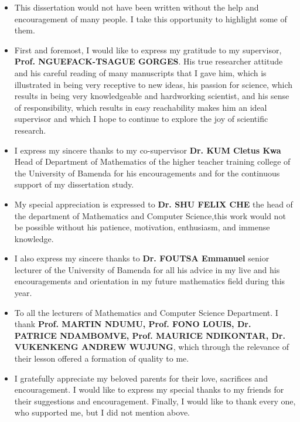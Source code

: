 \documentclass[a4paper,12pt,openany]{report}
\theoremstyle{plain}
\theoremstyle{plain}
\theoremstyle{plain}
\theoremstyle{plain}
\theoremstyle{plain}
\theoremstyle{plain}
\theoremstyle{plain}
\theoremstyle{plain}
\theoremstyle{plain}
\theoremstyle{plain}
\theoremstyle{plain}
\theoremstyle{plain}
\begin{document}
\begin{itemize}
\item[]	This dissertation would not have been written without the help and encouragement of many people. I
	take this opportunity to highlight some of them.
	
	\item[] First and foremost, I would like to express my gratitude to my supervisor, \textbf{Prof. NGUEFACK-TSAGUE GORGES}.
		His true researcher attitude and his careful reading of many manuscripts that I gave him, which is illustrated in being very receptive to new ideas, his passion
		for science, which results in being very knowledgeable and hardworking scientist, and his sense of
		responsibility, which results in easy reachability makes him an ideal supervisor and which I hope to continue to explore the joy of scientific research.
		\item[] I express my sincere thanks to my co-supervisor \textbf{Dr. KUM Cletus Kwa} Head of Department of Mathematics of the higher teacher training college of the University of Bamenda for his encouragements and for the continuous support of my dissertation study. 
		
		  \item[] My special appreciation
		is expressed to \textbf{ Dr. SHU FELIX CHE} the head of the department of Mathematics and Computer
		Science,this work would not be possible
		without his patience, motivation, enthusiasm, and immense knowledge.  
		
		\item[] I also express my sincere thanks to \textbf{Dr. FOUTSA Emmanuel} senior lecturer of the University of Bamenda for all his advice in my live and his encouragements and orientation in my future mathematics field during this year. 
		\item[] To all the lecturers of Mathematics and Computer Science Department. I thank \textbf{Prof. MARTIN NDUMU, Prof. FONO LOUIS, Dr. PATRICE NDAMBOMVE, Prof. MAURICE NDIKONTAR, Dr. VUKENKENG ANDREW WUJUNG}, which through the relevance of their lesson offered a formation of quality to me.
		\item[] I gratefully appreciate my beloved parents for their
		love, sacrifices and encouragement. I would like to express my special thanks to my friends for
		their suggestions and encouragement. Finally, I would like to thank every one, who supported
		me, but I did not mention above.
	\end{itemize}
	
\end{document}
